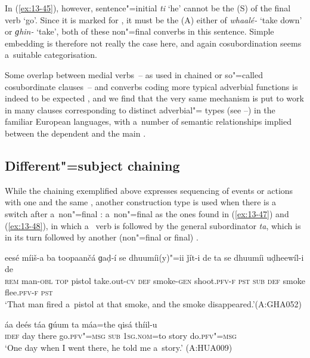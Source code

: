 In (\ref{ex:13-45}), however, sentence"=initial \textit{ti} `he' cannot be the  (S) of the  final verb `go'. Since it is marked for , it must be the  (A) either of  \textit{whaalé-} `take down' or  \textit{ɡhin-} `take', both of these non"=final converbs in this sentence. Simple embedding is therefore not really the case here, and again cosubordination seems a~suitable categorisation. 



Some overlap between medial verbs~-- as used in chained or so"=called cosubordinate clauses~-- and converbs coding more typical adverbial functions is indeed to be expected \citep[26]{haspelmath1995}, and we find that the very same mechanism is put to work in many clauses corresponding to distinct adverbial"= types (see --) in the familiar European languages, with a~number of semantic relationships implied between the dependent  and the main . 


\subsection{Different"={subject} chaining}
\label{subsec:13-3-2}


While the chaining exemplified above expresses sequencing of events or actions with one and the same , another construction type is used when there is a~ switch after a~non"=final : a~non"=final  as the ones found in (\ref{ex:13-47}) and (\ref{ex:13-48}), in which a~ verb is followed by the general subordinator \textit{ta}, which is in its turn followed by another (non"=final or final) .

\begin{exe}
\ex
\label{ex:13-47}
\gll eesé míiš-a ba toopaančá ɡaḍ-í {\ob}se dhuumíi(y)"=ii ǰít-i de ta{\cb} se dhuumíi uḍheewíl-i de \\
\textsc{rem} man-\textsc{obl} \textsc{top} pistol take.out-\textsc{cv} \textsc{def}  smoke-\textsc{gen} shoot.\textsc{pfv-f} \textsc{pst} \textsc{sub} \textsc{def} smoke flee.\textsc{pfv-f} \textsc{pst} \\
\glt `That man fired a~pistol at that smoke, and the smoke disappeared.'\newline (A:GHA052)

\ex
\label{ex:13-48}
\gll {\ob}áa deés táa ɡúum ta{\cb} máa=the qisá thíil-u \\
\textsc{idef} day there go.\textsc{pfv"=msg } \textsc{sub} \textsc{1sg.nom}=to story do.\textsc{pfv"=msg}  \\
\glt `One day when I went there, he told me a~story.' (A:HUA009) 
\end{exe}

